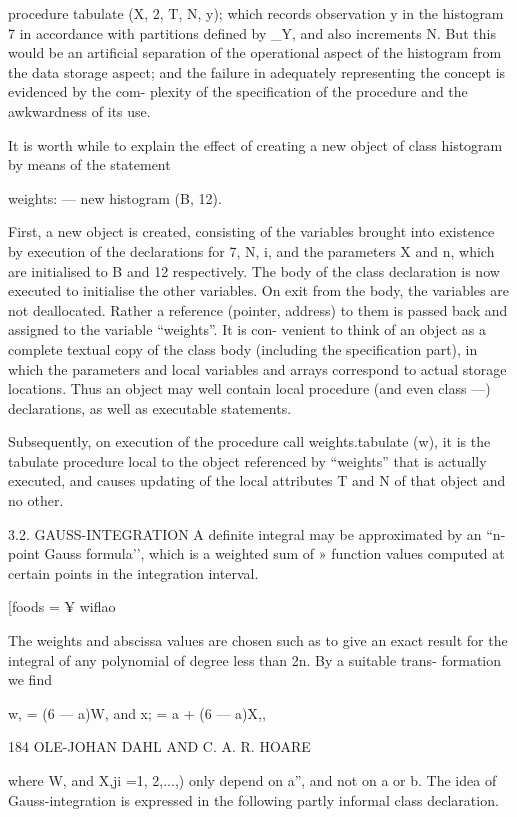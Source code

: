 procedure tabulate (X, 2, T, N, y); which records observation y in the histogram 7 in accordance with partitions defined by _Y, and also increments N. But this would be an artificial separation of the operational aspect of the histogram from the data storage aspect; and the failure in adequately representing the concept is evidenced by the com- plexity of the specification of the procedure and the awkwardness of its use.

It is worth while to explain the effect of creating a new object of class histogram by means of the statement

weights: — new histogram (B, 12).

First, a new object is created, consisting of the variables brought into existence by execution of the declarations for 7, N, i, and the parameters X and n, which are initialised to B and 12 respectively. The body of the class declaration is now executed to initialise the other variables. On exit from the body, the variables are not deallocated. Rather a reference (pointer, address) to them is passed back and assigned to the variable “weights”. It is con- venient to think of an object as a complete textual copy of the class body (including the specification part), in which the parameters and local variables and arrays correspond to actual storage locations. Thus an object may well contain local procedure (and even class —) declarations, as well as executable statements.

Subsequently, on execution of the procedure call weights.tabulate (w), it is the tabulate procedure local to the object referenced by “weights” that is actually executed, and causes updating of the local attributes T and N of that object and no other.

3.2. GAUSS-INTEGRATION A definite integral may be approximated by an “n-point Gauss formula’’, which is a weighted sum of » function values computed at certain points in the integration interval.

[foods = ¥ wiflao

The weights and abscissa values are chosen such as to give an exact result for the integral of any polynomial of degree less than 2n. By a suitable trans- formation we find

w, = (6 — a)W, and x; = a + (6 — a)X,,

184 OLE-JOHAN DAHL AND C. A. R. HOARE

where W, and X,ji =1, 2,...,) only depend on a”, and not on a or b. The idea of Gauss-integration is expressed in the following partly informal class declaration.

